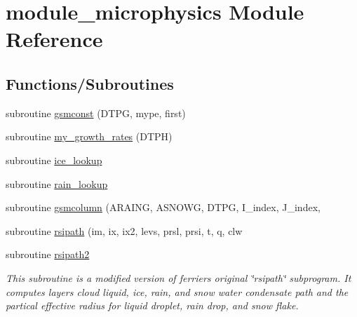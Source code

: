\hypertarget{namespacemodule__microphysics}{}\section{module\+\_\+microphysics Module Reference}
\label{namespacemodule__microphysics}
\subsection*{Functions/\+Subroutines}
\begin{DoxyCompactItemize}
\item 
subroutine \hyperlink{namespacemodule__microphysics_ad5f89457c2cd2ba431b1c60d5ecbecc4}{gsmconst} (D\+T\+PG, mype, first)
\item 
subroutine \hyperlink{namespacemodule__microphysics_aa41d6b0b3b4eca4b41999d6c6aadb317}{my\+\_\+growth\+\_\+rates} (D\+T\+PH)
\item 
subroutine \hyperlink{namespacemodule__microphysics_a9273c6542f2e983e0f9040c80907b3c6}{ice\+\_\+lookup}
\item 
subroutine \hyperlink{namespacemodule__microphysics_a0090b42e85bd381e5459a9e8db9dc120}{rain\+\_\+lookup}
\item 
subroutine \hyperlink{namespacemodule__microphysics_a7a0b4005a965eda2890022b02f807bb7}{gsmcolumn} (A\+R\+A\+I\+NG, A\+S\+N\+O\+WG, D\+T\+PG, I\+\_\+index, J\+\_\+index,    
\item 
subroutine \hyperlink{namespacemodule__microphysics_a9cf7964ff1097213773b2b91e13d18d0}{rsipath} (im, ix, ix2, levs, prsl, prsi, t, q, clw          
\end{DoxyCompactItemize}
{\bf }\par
\begin{DoxyCompactItemize}
\item 
subroutine \hyperlink{namespacemodule__microphysics_ac80bc526194e30c9e1a97e7833a2a77f}{rsipath2}                                                                                           
\begin{DoxyCompactList}\small\item\em This subroutine is a modified version of ferrier\textquotesingle{}s original \char`\"{}rsipath\char`\"{} subprogram. It computes layer\textquotesingle{}s cloud liquid, ice, rain, and snow water condensate path and the partical effective radius for liquid droplet, rain drop, and snow flake. \end{DoxyCompactList}\end{DoxyCompactItemize}

